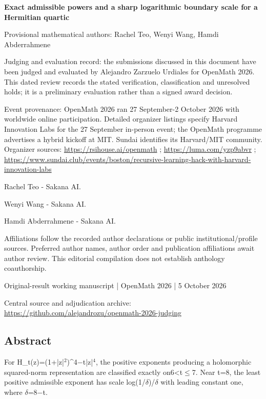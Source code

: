 \documentclass[11pt,a4paper]{article}
\begin{document}
{\LARGE\bfseries Exact admissible powers and a sharp logarithmic boundary scale for a Hermitian quartic\par}\medskip
{\small Provisional mathematical authors: Rachel Teo, Wenyi Wang, Hamdi Abderrahmene\par}\medskip
{\small Judging and evaluation record: the submissions discussed in this document have been judged and evaluated by Alejandro Zarzuelo Urdiales for OpenMath 2026. This dated review records the stated verification, classification and unresolved holds; it is a preliminary evaluation rather than a signed award decision.\par}

{\small Event provenance: OpenMath 2026 ran 27 September-2 October 2026 with worldwide online participation. Detailed organizer listings specify Harvard Innovation Labs for the 27 September in-person event; the OpenMath programme advertises a hybrid kickoff at MIT. Sundai identifies its Harvard/MIT community. Organizer sources: \url{https://rsihouse.ai/openmath} ; \url{https://luma.com/yzp9abvr} ; \url{https://www.sundai.club/events/boston/recursive-learning-hack-with-harvard-innovation-labs}\par}

{\small Rachel Teo  -  Sakana AI.\par}

{\small Wenyi Wang  -  Sakana AI.\par}

{\small Hamdi Abderrahmene  -  Sakana AI.\par}

{\small Affiliations follow the recorded author declarations or public institutional/profile sources. Preferred author names, author order and publication affiliations await author review. This editorial compilation does not establish anthology coauthorship.\par}

{\small Original-result working manuscript | OpenMath 2026 | 5 October 2026\par}\medskip
{\small Central source and adjudication archive: \url{https://github.com/alejandrozu/openmath-2026-judging}\par}

\subsection{Abstract}
For H\_t(z)=(1+|z|\ensuremath{^2})\textasciicircum{}4\ensuremath{-}t|z|\ensuremath{^4}, the positive exponents producing a holomorphic squared-norm representation are classified exactly on6<t\ensuremath{\leq}7. Near t=8, the least positive admissible exponent has scale log(1/\ensuremath{\delta})/\ensuremath{\delta} with leading constant one, where \ensuremath{\delta}=8\ensuremath{-}t.
\end{document}
